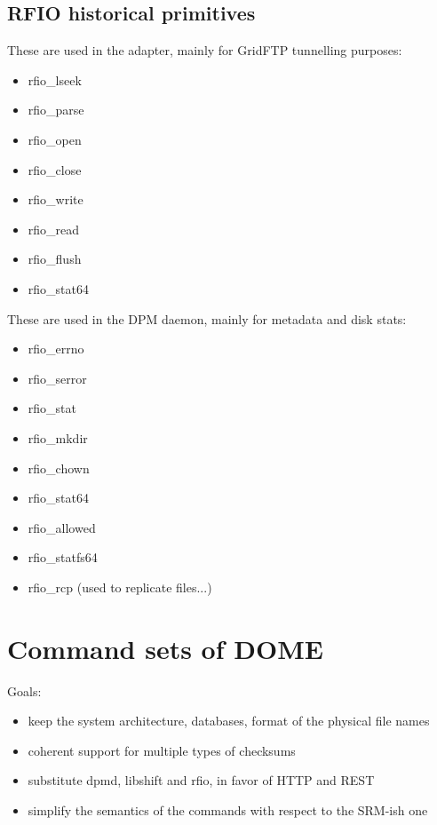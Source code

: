 \documentclass[a4paper,10pt]{scrreprt}
\begin{document}
\subsection{RFIO historical primitives}

 These are used in the adapter, mainly for GridFTP tunnelling purposes:\\

\begin{itemize}
\item rfio\_lseek
\item rfio\_parse
\item rfio\_open
\item rfio\_close
\item rfio\_write
\item rfio\_read
\item rfio\_flush
\item rfio\_stat64
\end{itemize}


 These are used in the DPM daemon, mainly for metadata and disk stats:\\

\begin{itemize}
\item rfio\_errno
\item rfio\_serror
\item rfio\_stat
\item rfio\_mkdir
\item rfio\_chown
\item rfio\_stat64
\item rfio\_allowed
\item rfio\_statfs64
\item rfio\_rcp (used to replicate files...)
\end{itemize}


\section{Command sets of DOME}
Goals:

\begin{itemize}
\item keep the system architecture, databases, format of the physical file names
\item coherent support for multiple types of checksums
\item substitute dpmd, libshift and rfio, in favor of HTTP and REST
\item simplify the semantics of the commands with respect to the SRM-ish one
\end{itemize}
\end{document}
